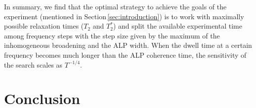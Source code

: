 \documentclass{WileyMSP-template}
\newcommand{\YZ}[1]{\textcolor{purple}{Yuzhe: #1}}
\newcommand{\DK}[1]{\textcolor{brown}{Derek: #1}}
\newcommand{\AW}[1]{\textcolor{cyan}{Arne: #1}}
\begin{document}

In summary, we find that the optimal
strategy to achieve the goals of the experiment (mentioned in Section\,\ref{sec:introduction}) is to work with maximally possible relaxation times ($T_2$ and $T_2^*$) and split the available experimental time among frequency steps with the step size given by the maximum of the inhomogeneous broadening and the ALP width.
When the dwell time at a certain frequency becomes much longer than the ALP coherence time, the sensitivity of the search scales as $T^{-1/4}$.  



\section{Conclusion}
\end{document}
